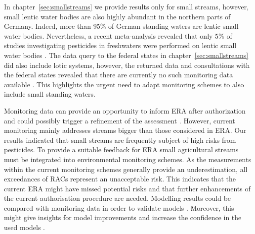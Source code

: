 In chapter~\ref{sec:smallstreams} we provide results only for small streams, however, small lentic water bodies are also highly abundant in the northern parts of Germany.
Indeed, more than 95\% of German standing waters are lentic small water bodies.
Nevertheless, a recent meta-analysis revealed that only 5\% of studies investigating pesticides in freshwaters were performed on lentic small water bodies \citep{lorenz_specifics_2016}.
The data query to the federal states in chapter~\ref{sec:smallstreams} did also include lotic systems, however, the returned data and consultations with the federal states revealed that there are currently no such monitoring data available \citep{brinke_umsetzung_2016}. 
This highlights the urgent need to adapt monitoring schemes to also include small standing waters.

Monitoring data can provide an opportunity to inform ERA after authorization and could possibly trigger a refinement of the assessment \citep{knauer_pesticides_2016}. 
However, current monitoring mainly addresses streams bigger than those considered in ERA.
Our results indicated that small streams are frequently subject of high risks from pesticides.
To provide a suitable feedback for ERA small agricultural streams must be integrated into environmental monitoring schemes. 
As the measurements within the current monitoring schemes generally provide an underestimation, all exceedances of RACs represent an unacceptable risk.
This indicates that the current ERA might have missed potential risks and that further enhancements of the current authorisation procedure are needed.
Modelling results could be compared with monitoring data in order to validate models \citep{knabel_fungicide_2014}.
Moreover, this might give insights for model improvements and increase the confidence in the used models \citep{gitzen_design_2012}.

